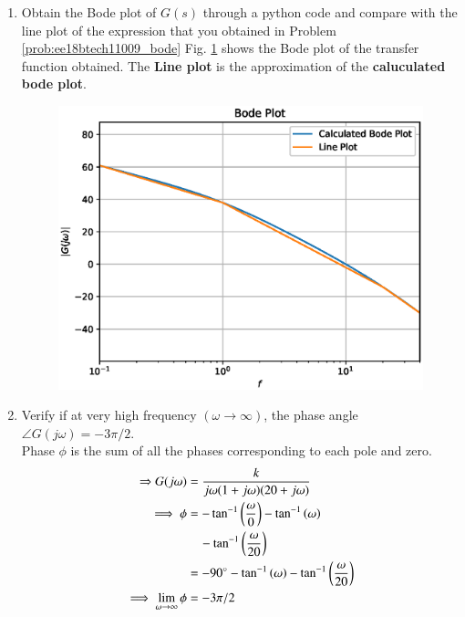 \begin{enumerate}[label=\thesubsection.\arabic*.,ref=\thesubsection.\theenumi]
\item Obtain the Bode plot of $G(s)$ through a python code and compare with the line plot of the expression that you obtained in Problem \ref{prob:ee18btech11009_bode}
\solution Fig. \ref{fig:ee10btech11009_line_plot} shows the Bode plot of the transfer function obtained.
 The \textbf{Line plot} is the approximation of the \textbf{caluculated bode plot}. 
\begin{figure}[htp]
	\centering
	\includegraphics[width= \columnwidth]{./figs/ee18btech11009/ee18btech11009.eps}
	\caption{}
	\label{fig:ee10btech11009_line_plot}
\end{figure} 

\item  Verify if at very high frequency $(\omega \to \infty)$, the phase angle $ \angle G(j\omega)=-3\pi/2$.
\\
\solution
Phase $ \phi $ is the sum of all the phases corresponding to each pole and zero.
  \begin{align}
 \Rightarrow  G(j\omega) &=  \frac{k}{j\omega(1+j\omega)(20+j\omega)}
\\
\implies  \phi &=  -\tan^{-1}\left( {\frac{\omega}{0}}\right) - \tan^{-1}\left(\omega\right) 
\nonumber\\
& \quad - \tan^{-1}\left( \frac{\omega}{20}\right)
\\
 & =  - 90\degree - \tan^{-1}\left(\omega\right) - \tan^{-1}\left( \frac{\omega}{20}\right)
\\
\implies  \lim_{\omega \to \infty}   \phi &=    -3\pi/2 
 \end{align} 

 \end{enumerate}
